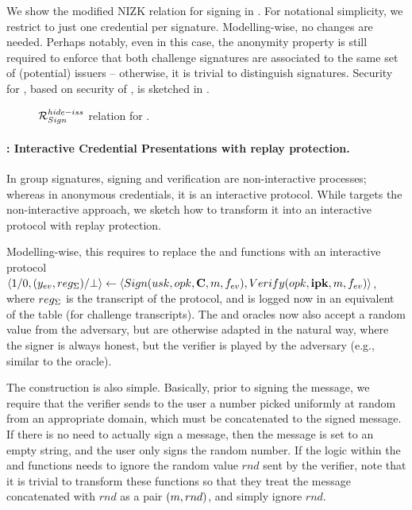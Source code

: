 We show the modified NIZK relation for signing in . For
notational simplicity, we restrict to just one credential per signature.
%
Modelling-wise, no changes are needed. Perhaps notably, even in this case, the
anonymity property is still required to enforce that both challenge signatures
are associated to the same set of (potential) issuers -- otherwise, it is
trivial to distinguish signatures. Security for \CUASGenHideIss, based on
security of \CUASGen, is sketched in .

\begin{figure}[ht!]
  \scalebox{0.85}{
    
  }
  \caption{$\mathcal{R}^{hide-iss}_{Sign}$ relation for \CUASGenHideIss.}
  \label{fig:nizk-ring}
\end{figure}

\paragraph{\CUASGenInt: Interactive Credential Presentations with replay
  protection.}
%
In group signatures, signing and verification are non-interactive processes;
whereas in anonymous credentials, it is an interactive protocol. While
\CUASGen targets the non-interactive approach, we sketch how to transform it
into an interactive protocol with replay protection.

Modelling-wise, this requires to replace the \Sign and \Verify functions with
an interactive protocol $\langle 1/0,(y_{ev},reg_{\Sigma})/\bot \rangle \gets
\langle Sign(usk,opk,\mathbf{C},m,f_{ev}), Verify(opk,\mathbf{ipk},m,f_{ev})
\rangle$,
where $reg_{\Sigma}$ is the transcript of the protocol, and is logged now in
an equivalent of the \SIG table (\CSIG for challenge transcripts). The \SIGN
and \CHALb oracles now also accept a random value from the adversary, but
are otherwise adapted in the natural way, where the signer is always honest, but
the verifier is played by the adversary (e.g., similar to the \OBTAIN oracle).

The construction is also simple. Basically, prior to signing the message, we
require that the verifier sends to the user a number picked uniformly at random
from an appropriate domain, which must be concatenated to the signed message. If
there is no need to actually sign a message, then the message is set to an empty
string, and the user only signs the random number.
%
If the logic within the \feval and \finsp functions needs to ignore the random
value $rnd$ sent by the verifier, note that it is trivial to transform these
functions so that they treat the message concatenated with $rnd$ as a pair
$(m,rnd)$, and simply ignore $rnd$.

